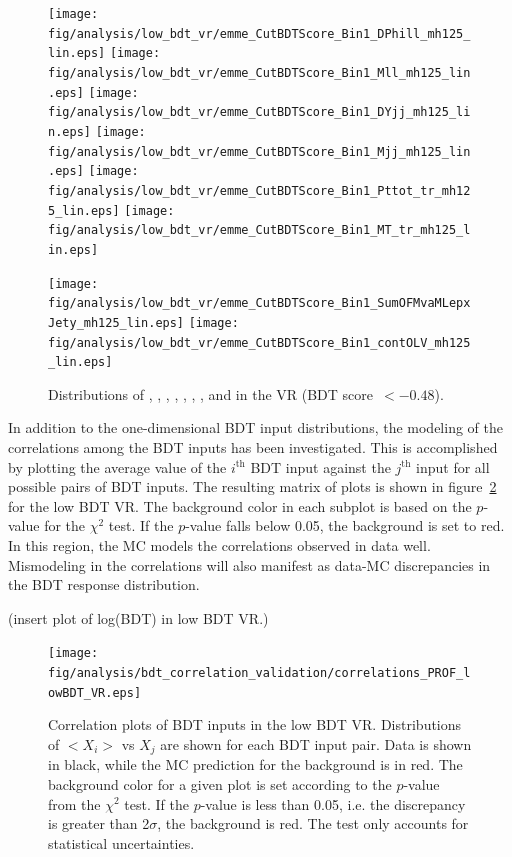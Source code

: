 \begin{figure}[h]
  \centering
  \texttt{[image: fig/analysis/low\_bdt\_vr/emme\_CutBDTScore\_Bin1\_DPhill\_mh125\_lin.eps]}
   \texttt{[image: fig/analysis/low\_bdt\_vr/emme\_CutBDTScore\_Bin1\_Mll\_mh125\_lin.eps]}
   \texttt{[image: fig/analysis/low\_bdt\_vr/emme\_CutBDTScore\_Bin1\_DYjj\_mh125\_lin.eps]}
   \texttt{[image: fig/analysis/low\_bdt\_vr/emme\_CutBDTScore\_Bin1\_Mjj\_mh125\_lin.eps]}
   \texttt{[image: fig/analysis/low\_bdt\_vr/emme\_CutBDTScore\_Bin1\_Pttot\_tr\_mh125\_lin.eps]}
   \texttt{[image: fig/analysis/low\_bdt\_vr/emme\_CutBDTScore\_Bin1\_MT\_tr\_mh125\_lin.eps]}

   \texttt{[image: fig/analysis/low\_bdt\_vr/emme\_CutBDTScore\_Bin1\_SumOFMvaMLepxJety\_mh125\_lin.eps]}
   \texttt{[image: fig/analysis/low\_bdt\_vr/emme\_CutBDTScore\_Bin1\_contOLV\_mh125\_lin.eps]}
   \caption{Distributions of \dphill, \mll, \dyjj, \mjj, \pTtot,  \mT,
     \SumMlj, and \lepEtaCent in the \emme VR (BDT score~$<-0.48$). }
  \label{chap:analysis:fig:low_bdt_vr_df}
\end{figure}

In addition to the one-dimensional BDT input distributions, the
modeling of the correlations among the BDT inputs has been
investigated. This is accomplished by plotting the average value of
the $i^{\textrm{th}}$ BDT input against the $j^{\textrm{th}}$ input
for all possible pairs of BDT inputs. The resulting matrix of
plots is shown in figure~\ref{chap:analysis:fig:bdt_corr_vr} for the
low BDT VR. The background color in each subplot is based on the
$p$-value for the $\chi^2$ test. If the $p$-value falls below 0.05,
the background is set to red. In this region, the MC models the correlations observed in
data well. Mismodeling in the correlations will also manifest as
data-MC discrepancies in the BDT response distribution. 

(insert plot of log(BDT) in low BDT VR.)

\begin{figure}[h!]
  \centering
  \texttt{[image: fig/analysis/bdt\_correlation\_validation/correlations\_PROF\_lowBDT\_VR.eps]}
  \caption{Correlation plots of BDT inputs in the low BDT VR. Distributions of
    $< X_i >$ vs $X_j$ are shown for each BDT input pair. Data is
    shown in black, while the MC prediction for the background is in
    red. The background color for a given plot is set according to the
  $p$-value from the $\chi^2$ test. If the $p$-value is less than
    0.05, i.e. the discrepancy is greater than 2$\sigma$, the
    background is red. The test only accounts for statistical uncertainties.}
  \label{chap:analysis:fig:bdt_corr_vr}
\end{figure}

